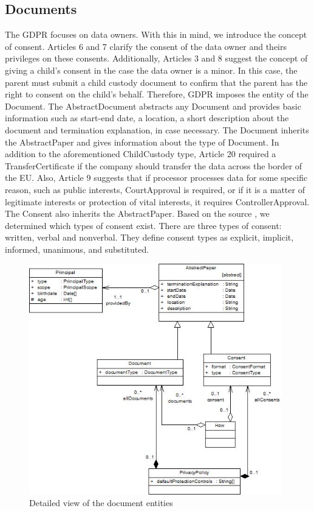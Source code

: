 \documentclass[11pt,english]{article}
\begin{document}
\subsection{Documents}
The GDPR focuses on data owners. With this in mind, we introduce the concept of consent. Articles 6 and 7 clarify the consent of the data owner and theirs privileges on these consents. Additionally, Articles 3 and 8 suggest the concept of giving a child's consent in the case the data owner is a minor. In this case, the parent must submit a child custody document to confirm that the parent has the right to consent on the child's behalf. Therefore, GDPR imposes the entity of the Document. \newline The AbstractDocument abstracts any Document and provides basic information such as start-end date,  a location, a short description about the document and termination explanation, in case necessary. \newline  The Document inherits the AbstractPaper and gives information about the type of Document. In addition to the aforementioned ChildCustody type, Article 20 required a TransferCertificate if the company should transfer the data across the border of the EU. Also, Article 9 suggests that if processor processes data for some specific reason, such as public interests, CourtApproval is required, or if it is a matter of legitimate interests or protection of vital interests, it requires ControllerApproval. \newline The Consent also inherits the AbstractPaper. Based on the source \cite{consent}, we determined which types of consent exist. There are three types of consent: written, verbal and nonverbal. They define consent types as explicit, implicit, informed, unanimous, and substituted.
\begin{figure}[H]
    \centering
    \includegraphics[width=11cm]{images/document.jpg}
    \caption{Detailed view of the document entities}
    \label{fig:Document}
\end{figure}
\end{document}
